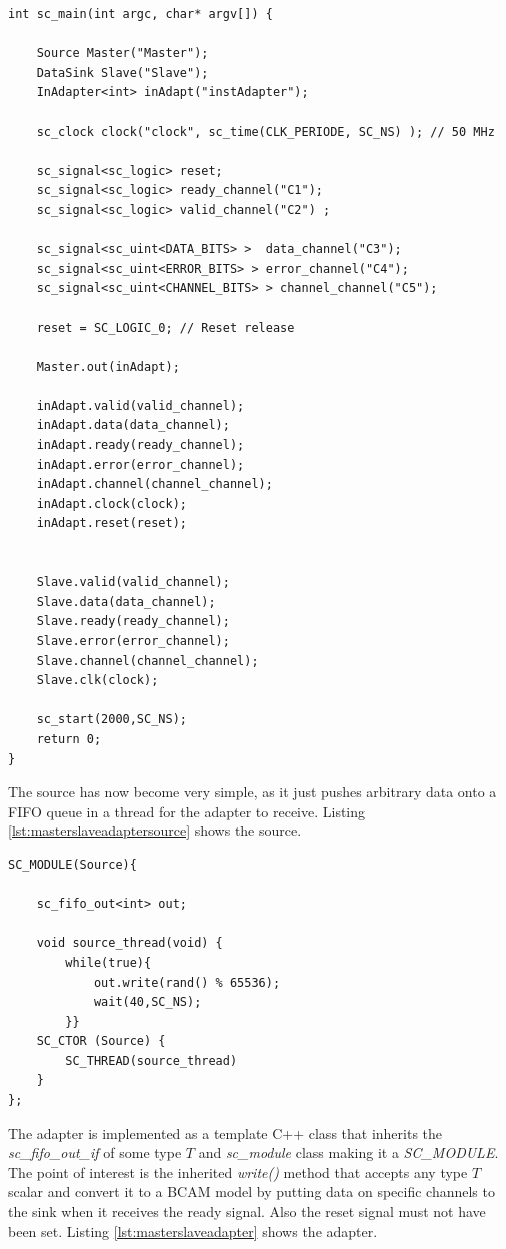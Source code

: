 \begin{lstlisting}[style=customc++, caption=Application file for master/slave with an adapter.,
label={lst:masterslaveadaptermain}]
int sc_main(int argc, char* argv[]) {

	Source Master("Master");
	DataSink Slave("Slave");
	InAdapter<int> inAdapt("instAdapter");
	
	sc_clock clock("clock", sc_time(CLK_PERIODE, SC_NS) ); // 50 MHz
	
	sc_signal<sc_logic> reset;
	sc_signal<sc_logic> ready_channel("C1");
	sc_signal<sc_logic> valid_channel("C2") ;
	
	sc_signal<sc_uint<DATA_BITS> >  data_channel("C3");
	sc_signal<sc_uint<ERROR_BITS> > error_channel("C4");
	sc_signal<sc_uint<CHANNEL_BITS> > channel_channel("C5");
	
	reset = SC_LOGIC_0; // Reset release
	
	Master.out(inAdapt);
	
	inAdapt.valid(valid_channel);
	inAdapt.data(data_channel);
	inAdapt.ready(ready_channel);
	inAdapt.error(error_channel);
	inAdapt.channel(channel_channel);
	inAdapt.clock(clock);
	inAdapt.reset(reset);
	
	
	Slave.valid(valid_channel);
	Slave.data(data_channel);
	Slave.ready(ready_channel);
	Slave.error(error_channel);
	Slave.channel(channel_channel);
	Slave.clk(clock);

	sc_start(2000,SC_NS);
	return 0;
}
\end{lstlisting}
\newpage
\noindent The source has now become very simple, as it just pushes arbitrary data onto a FIFO queue in a thread for the adapter to receive. Listing \ref{lst:masterslaveadaptersource} shows the source.

\begin{lstlisting}[style=customc++, caption=Source module that generates data.,
label={lst:masterslaveadaptersource}]
SC_MODULE(Source){

	sc_fifo_out<int> out;
	
	void source_thread(void) {
		while(true){
			out.write(rand() % 65536);
			wait(40,SC_NS);
		}}
	SC_CTOR (Source) {
		SC_THREAD(source_thread)
	}
};
\end{lstlisting}
\newpage
\noindent The adapter is implemented as a template C++ class that inherits the \textit{sc\_fifo\_out\_if} of some type $T$ and \textit{sc\_module} class making it a \textit{SC\_MODULE}. The point of interest is the inherited \textit{write()} method that accepts any type $T$ scalar and convert it to a BCAM model by putting data on specific channels to the sink when it receives the ready signal. Also the reset signal must not have been set. Listing \ref{lst:masterslaveadapter} shows the adapter.

